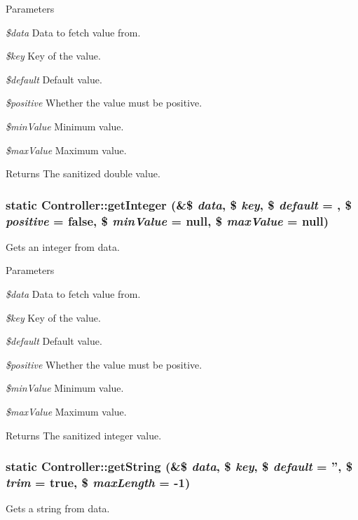 \begin{DoxyParams}{Parameters}
\item[{\em \$data}]Data to fetch value from. \item[{\em \$key}]Key of the value. \item[{\em \$default}]Default value. \item[{\em \$positive}]Whether the value must be positive. \item[{\em \$minValue}]Minimum value. \item[{\em \$maxValue}]Maximum value.\end{DoxyParams}
\begin{DoxyReturn}{Returns}
The sanitized double value. 
\end{DoxyReturn}
\hypertarget{classController_a54a271ee06846fdefff68d7127ff2988}{
\subsubsection[{getInteger}]{\setlength{\rightskip}{0pt plus 5cm}static Controller::getInteger (\&\$ {\em data}, \/  \$ {\em key}, \/  \$ {\em default} = {}, \/  \$ {\em positive} = {\ttfamily false}, \/  \$ {\em minValue} = {\ttfamily null}, \/  \$ {\em maxValue} = {\ttfamily null})}}
\label{classController_a54a271ee06846fdefff68d7127ff2988}
Gets an integer from data.


\begin{DoxyParams}{Parameters}
\item[{\em \$data}]Data to fetch value from. \item[{\em \$key}]Key of the value. \item[{\em \$default}]Default value. \item[{\em \$positive}]Whether the value must be positive. \item[{\em \$minValue}]Minimum value. \item[{\em \$maxValue}]Maximum value.\end{DoxyParams}
\begin{DoxyReturn}{Returns}
The sanitized integer value. 
\end{DoxyReturn}
\hypertarget{classController_afe45c54a315e0b5e17ac527df866550d}{
\subsubsection[{getString}]{\setlength{\rightskip}{0pt plus 5cm}static Controller::getString (\&\$ {\em data}, \/  \$ {\em key}, \/  \$ {\em default} = {\ttfamily ''}, \/  \$ {\em trim} = {\ttfamily true}, \/  \$ {\em maxLength} = {\ttfamily -\/1})}}
\label{classController_afe45c54a315e0b5e17ac527df866550d}
Gets a string from data.



